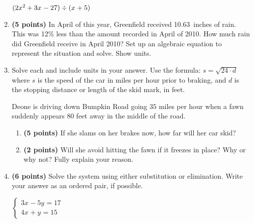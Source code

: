 \documentclass[12pt]{amsart}
\begin{document}
\begin{enumerate}
$(2x^{2}+3x^{}-27) \div (x^{}+5)$

\vfill  \vfill \vfill
\newpage\def \discount{12}\def \paid{1177.14}\def \rainy{10.63}\def \orcost{1337.66}\def \purcost{1051.02}\def \orrainy{12.08}
\item {\bf (5 points)} 
 In April of this year, Greenfield received \rainy\ inches of rain. This was \discount\% less than the amount recorded in April of 2010. How much rain did Greenfield  receive in April 2010? Set up an algebraic equation to represent the situation and solve. Show units.

\vfill 
\def \insvar{24}\def \d{80}\def \zerospeed{43.82}\def \slimit{35}\def \s{50}\def \skidd{104.167}\def \safed{51.042}\def \rsafed{51}

 
\item Solve each and include units in your answer. Use the formula: $s = \sqrt{\insvar \cdot d}$ where $s$ is the speed of the car in miles per hour prior to braking, and $d$ is the stopping distance or length of the skid mark, in feet. 

\vspace{3mm}

Deone is driving down Bumpkin Road going $\slimit$ miles per hour when a fawn suddenly appears $\d$ feet away in the middle of the road. \begin{enumerate}
\item {\bf (5 points)} If she slams on her brakes now, how far will her car skid? \vspace{4cm}
\item {\bf (2 points)} Will she avoid hitting the fawn if it freezes in place? Why or why not? Fully explain your reason. \vspace{3cm}
\end{enumerate}


\newpage\def \xis{4}\def \yis{-1}\def \nomatcho{[5,2,2,3]}\def \a{5}\def \c{-2}\def \b{-2}\def \d{-3}\def \polyonesol{22}\def \polytwosol{-5}\def \xgoodone{5x^{}}\def \ygoodone{-2y^{}}\def \xgoodtwo{-2x^{}}\def \ygoodtwo{-3y^{}}\def \unitize{[0,0,0,1,0,1]}\def \mtem{3}\def \ntem{-5}\def \ptem{4}\def \qtem{3}\def \m{3}\def \n{-5}\def \p{4}\def \q{1}\def \polytonesol{17}\def \polyttwosol{15}\def \xtgoodone{3x^{}}\def \ytgoodone{-5y^{}}\def \xtgoodtwo{4x^{}}\def \ytgoodtwo{+y^{}}
\item {\bf (6 points)} 
 Solve the system using either substitution or elimination. Write your answer as an ordered pair, if possible. 

$ \begin{cases} \xtgoodone \ytgoodone = \polytonesol \\
\xtgoodtwo \ytgoodtwo = \polyttwosol
\end{cases}$


\end{enumerate}
\end{document}

